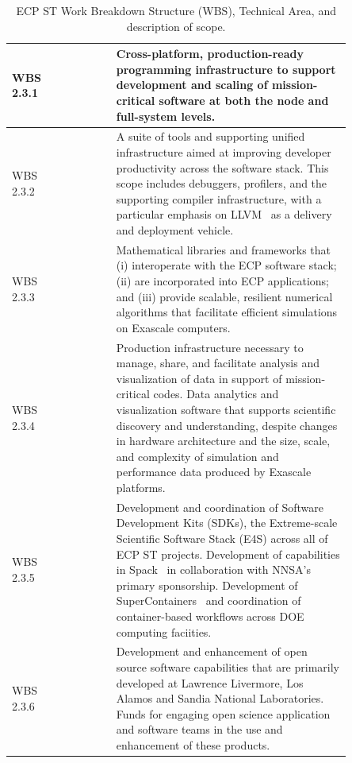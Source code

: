 \begin{table}
	\begin{tabular}{|>{\columncolor[gray]{0.8}}p{0.10\linewidth}|>{\columncolor[rgb]{0.88,1,1}}p{0.15\linewidth}|p{0.6\linewidth}|}\hline
	    \vfill WBS 2.3.1\vfill & \vfill \centering{Programming Models and Runtimes} \vfill & \vfill Cross-platform, production-ready programming infrastructure to support development and scaling of mission-critical software at both the node and full-system levels.\vfill \\\hline
		\vfill WBS 2.3.2 \vfill & \vfill \centering{Development Tools} \vfill & \vfill A suite of tools and supporting unified infrastructure aimed at improving developer productivity across the software stack. This scope includes debuggers, profilers, and the supporting compiler infrastructure, with a particular emphasis on LLVM~\cite{LLVM:2018} as a delivery and deployment vehicle. \vfill \\\hline
		\vfill WBS 2.3.3 \vfill & \vfill \centering{Mathematical Libraries} \vfill & \vfill Mathematical libraries and frameworks that (i) interoperate with the ECP software stack; (ii) are incorporated into ECP applications; and (iii) provide scalable, resilient numerical algorithms that facilitate efficient simulations on Exascale computers.\vfill \\\hline
		\vfill WBS 2.3.4 \vfill & \vfill \centering{Data and Visualization} \vfill & \vfill Production infrastructure necessary to manage, share, and facilitate analysis and visualization of data in support of mission-critical codes. Data analytics and visualization software that supports scientific discovery and understanding, despite changes in hardware architecture and the size, scale, and complexity of simulation and performance data produced by Exascale platforms. \vfill \\\hline
		\vfill WBS 2.3.5 \vfill & \vfill \centering{Software Ecosystem and Delivery} \vfill & \vfill Development and coordination of Software Development Kits (SDKs), the Extreme-scale Scientific Software Stack (E4S) across all of ECP ST projects.  Development of capabilities in Spack~\cite{gamblin+:sc15} in collaboration with NNSA's primary sponsorship.  Development of SuperContainers~\cite{Supercontainers} and coordination of container-based workflows across DOE computing faciities.\vfill \\\hline
		\vfill WBS 2.3.6 \vfill & \vfill \centering{NNSA ST} \vfill & \vfill Development and enhancement of open source software capabilities that are primarily developed at Lawrence Livermore, Los Alamos and Sandia National Laboratories.  Funds for engaging open science application and software teams in the use and enhancement of these products.\vfill \\\hline
	\end{tabular}
	\caption{\label{table:wbs} ECP ST Work Breakdown Structure (WBS), Technical Area, and description of scope.}
\end{table}

